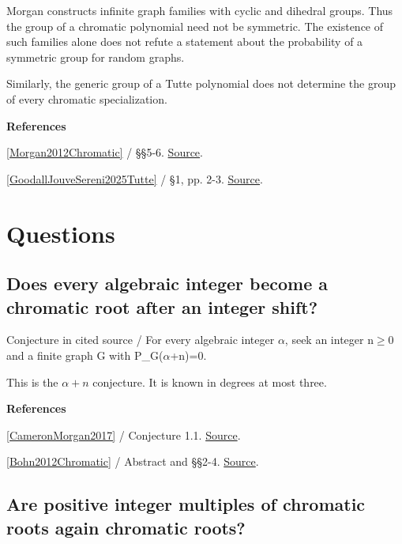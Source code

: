 \documentclass[11pt,a4paper,oneside,openany]{book}
\newenvironment{sources}{\par\smallskip\begingroup\footnotesize\color{atlasgray}\leftskip=10pt\setlength{\parskip}{2pt}}{\par\endgroup\smallskip}
\begin{document}
\color{black} Morgan constructs infinite graph families with cyclic and dihedral groups. Thus the group of a chromatic polynomial need not be symmetric. The existence of such families alone does not refute a statement about the probability of a symmetric group for random graphs.\par
\color{black} Similarly, the generic group of a Tutte polynomial does not determine the group of every chromatic specialization.\par
\begin{sources}
\textbf{References}\par\smallskip
\noindent\hyperlink{ref:Morgan2012Chromatic}{[Morgan2012Chromatic]} / §§5-6.  \href{https://doi.org/10.1112/S1461157012001052}{Source}.\par
\noindent\hyperlink{ref:GoodallJouveSereni2025Tutte}{[GoodallJouveSereni2025Tutte]} / §1, pp. 2-3.  \href{https://arxiv.org/abs/2510.05658}{Source}.\par
\end{sources}\color{black}
\section*{Questions}
\subsection*{Does every algebraic integer become a chromatic root after an integer shift?}
{\small\sffamily\color{atlasgold}Conjecture in cited source / For every algebraic integer \ensuremath{\alpha}, seek an integer n\ensuremath{\ge}0 and a finite graph G with P\_\allowbreak{}G(\ensuremath{\alpha}+n)=0.}\par\smallskip
\color{black} This is the \(\alpha+n\) conjecture. It is known in degrees at most three.\par
\begin{sources}
\textbf{References}\par\smallskip
\noindent\hyperlink{ref:CameronMorgan2017}{[CameronMorgan2017]} / Conjecture 1.1.  \href{https://doi.org/10.37236/6578}{Source}.\par
\noindent\hyperlink{ref:Bohn2012Chromatic}{[Bohn2012Chromatic]} / Abstract and §§2-4.  \href{https://doi.org/10.46298/dmtcs.3061}{Source}.\par
\end{sources}\color{black}
\subsection*{Are positive integer multiples of chromatic roots again chromatic roots?}
\end{document}
